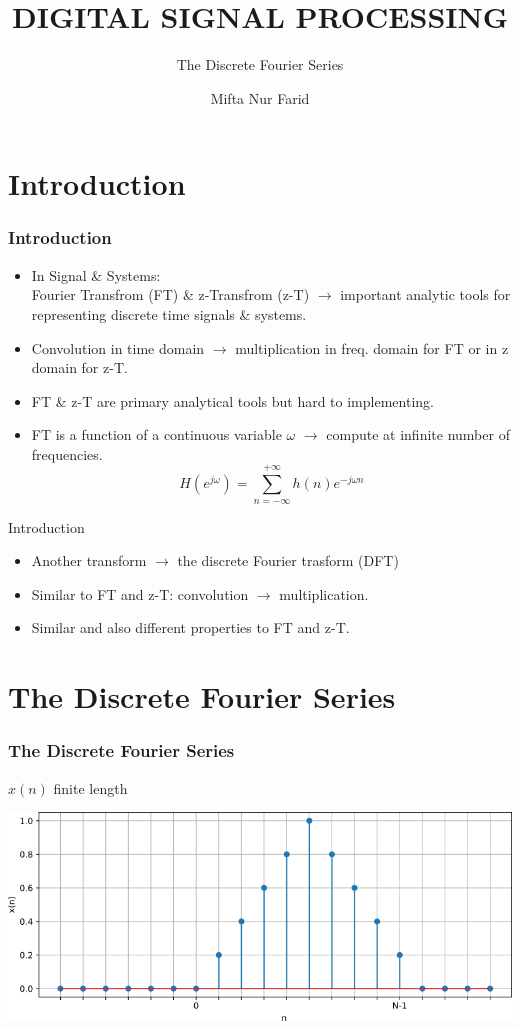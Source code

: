 \documentclass[pdflatex,compress,mathserif]{beamer}
\title{DIGITAL SIGNAL PROCESSING}
\subtitle{The Discrete Fourier Series}
\author{Mifta Nur Farid}
\begin{document}
\maketitle

\section{Introduction}

\begin{frame}
	\frametitle{Introduction}
	\begin{itemize}
		\item In Signal \& Systems:\\
		Fourier Transfrom (FT) \& z-Transfrom (z-T) $\rightarrow$ important analytic tools for representing discrete time signals \& systems.
		\item Convolution in time domain $\rightarrow$ multiplication in freq. domain for FT or in z domain for z-T.
		\item FT \& z-T are primary analytical tools but hard to implementing.
		\item FT is a function of a continuous variable $\omega$ $\rightarrow$ compute at infinite number of frequencies. $$ H(e^{j\omega}) = \sum\limits_{n=-\infty}^{+\infty} h(n)e^{-j \omega n} $$
	\end{itemize}
\end{frame}

\begin{frame}{Introduction}
	\begin{itemize}
		\item Another transform $\rightarrow$ the discrete Fourier trasform (DFT)
		\item Similar to FT and z-T: convolution $\rightarrow$ multiplication.
		\item Similar and also different properties to FT and z-T.
	\end{itemize}
\end{frame}

\section{The Discrete Fourier Series}

\begin{frame}
	\frametitle{The Discrete Fourier Series}
	$ x(n) $ finite length
	\begin{center}
		\includegraphics[width=\linewidth]{img/01}
	\end{center}
\end{frame}
\end{document}
